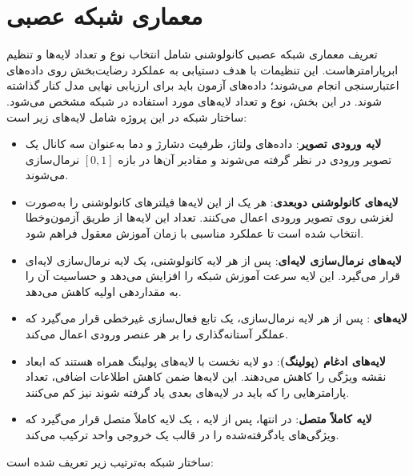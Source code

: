 \section{معماری شبکه عصبی}
\label{sec:architecture}

تعریف معماری شبکه عصبی کانولوشنی شامل انتخاب نوع و تعداد لایه‌ها و تنظیم ابرپارامترهاست. این تنظیمات با هدف دستیابی به عملکرد رضایت‌بخش روی داده‌های اعتبارسنجی انجام می‌شوند؛ داده‌های آزمون باید برای ارزیابی نهایی مدل کنار گذاشته شوند. در این بخش، نوع و تعداد لایه‌های مورد استفاده در شبکه مشخص می‌شود. ساختار شبکه در این پروژه شامل لایه‌های زیر است:

\begin{itemize}
\item \textbf{لایه ورودی تصویر}: داده‌های ولتاژ، ظرفیت دشارژ و دما به‌عنوان سه کانال یک تصویر ورودی در نظر گرفته می‌شوند و مقادیر آن‌ها در بازه $[0,1]$ نرمال‌سازی می‌شوند.
\item \textbf{لایه‌های کانولوشنی دوبعدی}: هر یک از این لایه‌ها فیلترهای کانولوشنی را به‌صورت لغزشی روی تصویر ورودی اعمال می‌کنند. تعداد این لایه‌ها از طریق آزمون‌وخطا انتخاب شده است تا عملکرد مناسبی با زمان آموزش معقول فراهم شود.
\item \textbf{لایه‌های نرمال‌سازی لایه‌ای}: پس از هر لایه کانولوشنی، یک لایه نرمال‌سازی لایه‌ای قرار می‌گیرد. این لایه سرعت آموزش شبکه را افزایش می‌دهد و حساسیت آن را به مقداردهی اولیه کاهش می‌دهد.
\item \textbf{لایه‌های }: پس از هر لایه نرمال‌سازی، یک تابع فعال‌سازی غیرخطی قرار می‌گیرد که عملگر آستانه‌گذاری را بر هر عنصر ورودی اعمال می‌کند.
\item \textbf{لایه‌های ادغام (پولینگ)}: دو لایه نخست  با لایه‌های پولینگ همراه هستند که ابعاد نقشه ویژگی را کاهش می‌دهند. این لایه‌ها ضمن کاهش اطلاعات اضافی، تعداد پارامترهایی را که باید در لایه‌های بعدی یاد گرفته شوند نیز کم می‌کنند.
\item \textbf{لایه کاملاً متصل}: در انتها، پس از لایه ، یک لایه کاملاً متصل قرار می‌گیرد که ویژگی‌های یادگرفته‌شده را در قالب یک خروجی واحد ترکیب می‌کند.
\end{itemize}

ساختار شبکه به‌ترتیب زیر تعریف شده است:






